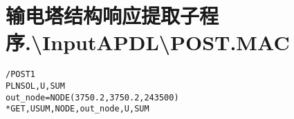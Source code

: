 \section{输电塔结构响应提取子程序.\textbackslash{}InputAPDL\textbackslash{}POST.MAC}
\begin{verbatim}
/POST1
PLNSOL,U,SUM
out_node=NODE(3750.2,3750.2,243500)
*GET,USUM,NODE,out_node,U,SUM

\end{verbatim}
